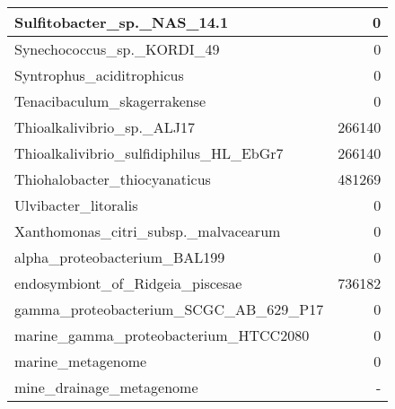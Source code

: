 \documentclass[12pt,a4paper]{article}
\begin{document}
\begin{table}[ht]
\begin{center}
\begin{tabular}{|l*{1}{|r}|}
Sulfitobacter\_sp.\_NAS\_14.1 & 0 \\ \hline
Synechococcus\_sp.\_KORDI\_49 & 0 \\ \hline
Syntrophus\_aciditrophicus & 0 \\ \hline
Tenacibaculum\_skagerrakense & 0 \\ \hline
Thioalkalivibrio\_sp.\_ALJ17 & 266140 \\ \hline
Thioalkalivibrio\_sulfidiphilus\_HL\_EbGr7 & 266140 \\ \hline
Thiohalobacter\_thiocyanaticus & 481269 \\ \hline
Ulvibacter\_litoralis & 0 \\ \hline
Xanthomonas\_citri\_subsp.\_malvacearum & 0 \\ \hline
alpha\_proteobacterium\_BAL199 & 0 \\ \hline
endosymbiont\_of\_Ridgeia\_piscesae & 736182 \\ \hline
gamma\_proteobacterium\_SCGC\_AB\_629\_P17 & 0 \\ \hline
marine\_gamma\_proteobacterium\_HTCC2080 & 0 \\ \hline
marine\_metagenome & 0 \\ \hline
mine\_drainage\_metagenome & - \\ \hline
\end{tabular}
\end{center}
\end{table}
\end{document}
